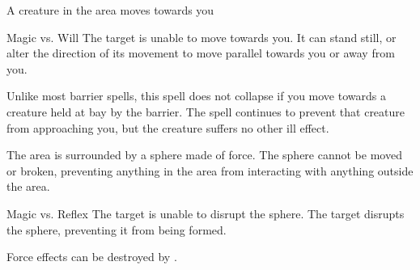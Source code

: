 \begin{spellheader}
    \spelldur{\durshort \dismissable}
\end{spellheader}
\begin{spelleffects}
    \begin{spelltrigger}{A creature in the area moves towards you}
        \begin{spellattack}{Magic vs. Will}
            \spellsuccess The target is unable to move towards you. It can stand still, or alter the direction of its movement to move parallel towards you or away from you.
        \end{spellattack}
    \end{spelltrigger}
\end{spelleffects}
\begin{spellfooter}
    \spellnotes Unlike most barrier spells, this spell does not collapse if you move towards a creature held at bay by the barrier. The spell continues to prevent that creature from approaching you, but the creature suffers no other ill effect.
\end{spellfooter}

\begin{spellheader}
    \spellrng{\rngmed}
    \spelldur{\durshort \dismissable}
\end{spellheader}
\begin{spelleffects}
    \spelleffect The area is surrounded by a sphere made of force. The sphere cannot be moved or broken, preventing anything in the area from interacting with anything outside the area.
    \begin{spellattack}{Magic vs. Reflex}
        \spellsuccess The target is unable to disrupt the sphere.
        \spellfailure The target disrupts the sphere, preventing it from being formed.
    \end{spellattack}
\end{spelleffects}
\begin{spellfooter}
    \spellnotes Force effects can be destroyed by .
\end{spellfooter}

